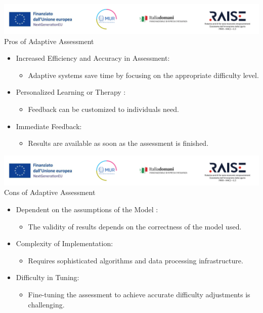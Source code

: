\documentclass{beamer}
\begin{document}
\begin{frame}{\includegraphics[scale=0.4]{Da_cambiare.png} \\ 
Pros of Adaptive Assessment}
\begin{itemize}
    \item Increased Efficiency and Accuracy in Assessment:
    \begin{itemize}
        \item Adaptive systems save time by focusing on the appropriate difficulty level.
    \end{itemize}
    \vspace{.3 cm}
    \item Personalized Learning or Therapy :
    \begin{itemize}
        \item Feedback can be customized to individuals need.
    \end{itemize}
     \vspace{.3 cm}
    \item Immediate Feedback:
    \begin{itemize}
        \item Results are available as soon as the assessment is finished.
    \end{itemize}
\end{itemize}
\end{frame}

\begin{frame}{\includegraphics[scale=0.4]{Da_cambiare.png} \\ 
Cons of Adaptive Assessment}
\begin{itemize}
    \item Dependent on the assumptions of the Model :
    \begin{itemize}
        \item The validity of results depends on the correctness of the model used.
    \end{itemize}
     \vspace{.3 cm}
    \item  Complexity of Implementation:
    \begin{itemize}
        \item Requires sophisticated algorithms and data processing infrastructure.
    \end{itemize}
     \vspace{.3 cm}
    \item Difficulty in Tuning:
    \begin{itemize}
        \item Fine-tuning the assessment to achieve accurate difficulty adjustments is challenging.
    \end{itemize}
\end{itemize}
\end{frame}
\end{document}
